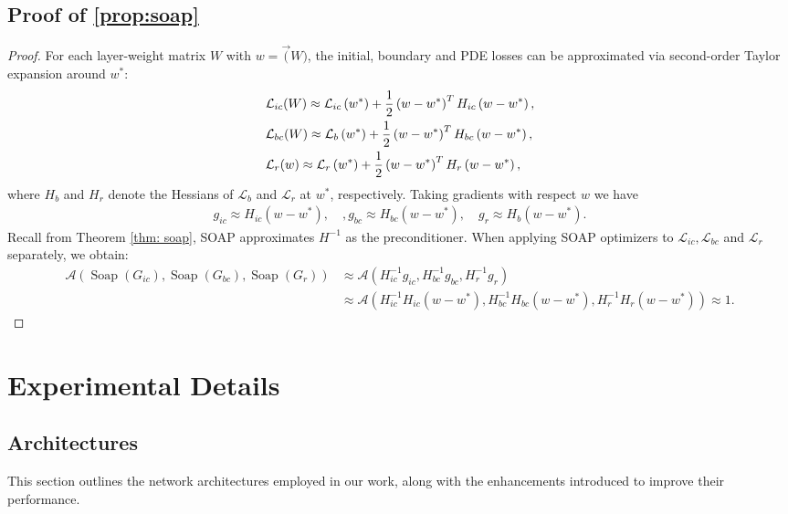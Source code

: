 \subsection{Proof of \cref{prop:soap}}
\begin{proof}
\label{proof:soap}
For each layer-weight matrix $W$ with $w = \Vec(W)$, the initial, boundary and PDE losses can be approximated via second-order Taylor expansion around $w^*$:
\begin{align*}
    & \mathcal{L}_{ic}(W) \approx \mathcal{L}_{ic}\left(w^*\right)+\frac{1}{2}\left(w-w^*\right)^T H_{ic} \left(w-w^*\right), \\
    & \mathcal{L}_{bc}(W) \approx \mathcal{L}_b\left(w^*\right)+\frac{1}{2}\left(w-w^*\right)^T H_{bc} \left(w-w^*\right), \\
& \mathcal{L}_r(w) \approx \mathcal{L}_r\left(w^*\right)+\frac{1}{2}\left(w-w^*\right)^T H_r\left(w-w^*\right),
\end{align*}
where $H_b$ and $H_r$ denote the Hessians of $\mathcal{L}_b$ and $\mathcal{L}_r$ at $w^*$, respectively. Taking gradients with respect $w$ we have
\begin{align*}
    g_{ic} \approx H_{ic}(w-w^*), \quad,  g_{bc} \approx H_{bc}(w-w^*), \quad g_r \approx H_b(w-w^*).
\end{align*}
Recall from Theorem \ref{thm: soap}, SOAP approximates $H^{-1}$ as the preconditioner. When applying SOAP optimizers to $\mathcal{L}_{ic}, \mathcal{L}_{bc}$ and $\mathcal{L}_r$ separately, we obtain:
\begin{align*}
    \mathcal{A}(\operatorname{Soap}(G_{ic}), \operatorname{Soap}(G_{bc}), \operatorname{Soap}(G_r)) &\approx  \mathcal{A}(H_{ic}^{-1}g_{ic}, H_{bc}^{-1}g_{bc}, H_r^{-1}g_r  ) \\
    &\approx \mathcal{A}(H_{ic}^{-1}H_{ic}(w-w^*), H_{bc}^{-1}H_{bc}(w-w^*), H_r^{-1}H_r(w-w^*)) \approx 1.
\end{align*}
\end{proof}


\section{Experimental Details}
\label{appendix: experiments}

\subsection{Architectures} 
\label{appendix:arch}

This section outlines the network architectures employed in our work, along with the enhancements introduced to improve their performance.




